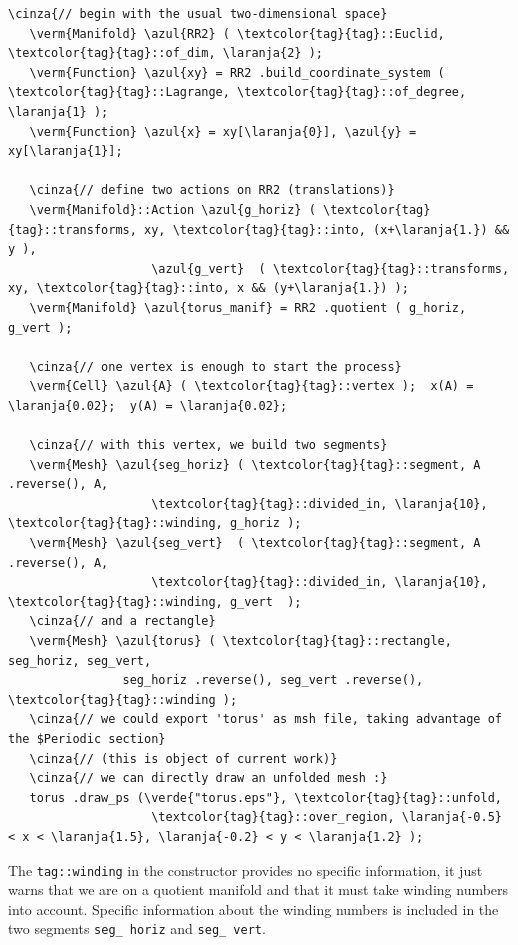 \begin{Verbatim}[commandchars=\\\{\},formatcom=\small\tt,frame=single,
   label=parag-\ref{\numb section 7.\numb parag 4}.cpp,rulecolor=\color{moldura},
   baselinestretch=0.94,framesep=2mm                                            ]
   \cinza{// begin with the usual two-dimensional space}
   \verm{Manifold} \azul{RR2} ( \textcolor{tag}{tag}::Euclid, \textcolor{tag}{tag}::of_dim, \laranja{2} );
   \verm{Function} \azul{xy} = RR2 .build_coordinate_system ( \textcolor{tag}{tag}::Lagrange, \textcolor{tag}{tag}::of_degree, \laranja{1} );
   \verm{Function} \azul{x} = xy[\laranja{0}], \azul{y} = xy[\laranja{1}];

   \cinza{// define two actions on RR2 (translations)}
   \verm{Manifold}::Action \azul{g_horiz} ( \textcolor{tag}{tag}::transforms, xy, \textcolor{tag}{tag}::into, (x+\laranja{1.}) && y ),
                    \azul{g_vert}  ( \textcolor{tag}{tag}::transforms, xy, \textcolor{tag}{tag}::into, x && (y+\laranja{1.}) );
   \verm{Manifold} \azul{torus_manif} = RR2 .quotient ( g_horiz, g_vert );

   \cinza{// one vertex is enough to start the process}
   \verm{Cell} \azul{A} ( \textcolor{tag}{tag}::vertex );  x(A) = \laranja{0.02};  y(A) = \laranja{0.02};

   \cinza{// with this vertex, we build two segments}
   \verm{Mesh} \azul{seg_horiz} ( \textcolor{tag}{tag}::segment, A .reverse(), A,
                    \textcolor{tag}{tag}::divided_in, \laranja{10}, \textcolor{tag}{tag}::winding, g_horiz );
   \verm{Mesh} \azul{seg_vert}  ( \textcolor{tag}{tag}::segment, A .reverse(), A,
                    \textcolor{tag}{tag}::divided_in, \laranja{10}, \textcolor{tag}{tag}::winding, g_vert  );
   \cinza{// and a rectangle}
   \verm{Mesh} \azul{torus} ( \textcolor{tag}{tag}::rectangle, seg_horiz, seg_vert,
                seg_horiz .reverse(), seg_vert .reverse(), \textcolor{tag}{tag}::winding );
   \cinza{// we could export 'torus' as msh file, taking advantage of the $Periodic section}
   \cinza{// (this is object of current work)}
   \cinza{// we can directly draw an unfolded mesh :}
   torus .draw_ps (\verde{"torus.eps"}, \textcolor{tag}{tag}::unfold,
                    \textcolor{tag}{tag}::over_region, \laranja{-0.5} < x < \laranja{1.5}, \laranja{-0.2} < y < \laranja{1.2} );
\end{Verbatim}

The {\small\tt\textcolor{tag}{tag}::winding} in the constructor {\small\tt{}}
{\small\tt{}} provides no specific information, it just warns {\maniFEM} that
we are on a quotient manifold and that it must take winding numbers into account.
Specific information about the winding numbers is included in the two segments
{\small\tt seg\_\,horiz} and {\small\tt seg\_\,vert}.


